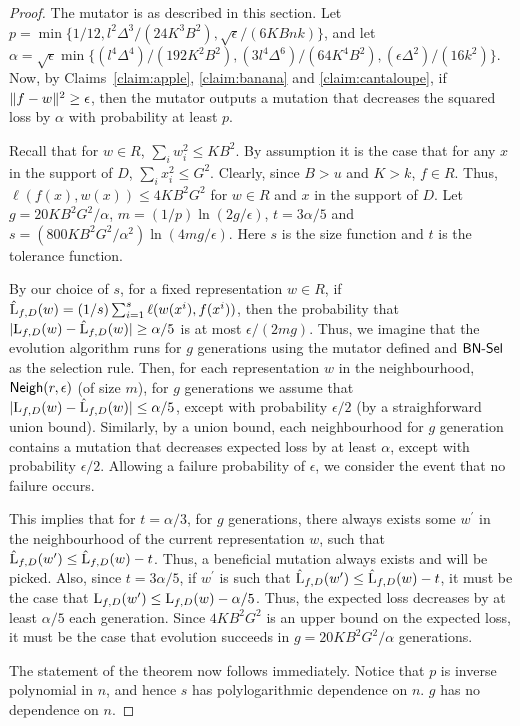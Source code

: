 \begin{proof}
The mutator is as described in this section. Let $p = \min\{1/12,
l^2\Delta^3/(24K^3B^2), \sqrt{\epsilon}/(6KBnk)\}$, and let $\alpha =
\sqrt{\epsilon} \min\{(l^4 \Delta^4)/(192 K^2B^2), (3 l^4 \Delta^6)/(64K^4B^2),
(\epsilon\Delta^2)/(16k^2)\}$. Now, by Claims~\ref{claim:apple},
\ref{claim:banana} and \ref{claim:cantaloupe}, if $\Vert f - w \Vert^2 \geq
\epsilon$, then the mutator outputs a mutation that decreases the squared loss
by $\alpha$ with probability at least $p$.

Recall that for $w \in R$, $\sum_{i} w_i^2 \leq KB^2$. By assumption it is the
case that for any $x$ in the support of $D$, $\sum_{i} x_i^2 \leq G^2$. Clearly,
since $B > u$ and $K > k$, $f \in R$. Thus, $\ell(f(x), w(x)) \leq 4KB^2G^2$ for
$w \in R$ and $x$ in the support of $D$. Let $g = 20 KB^2G^2/\alpha$, $m =
(1/p)\ln(2g/\epsilon)$, $t = 3\alpha/5$  and $s = (800 KB^2G^2/\alpha^2)
\ln(4mg/\epsilon)$. Here $s$ is the size function and $t$ is the tolerance
function.

By our choice of $s$, for a fixed representation $w \in R$, if $\hat{\mathrm{L}}_{f,
D}(w) = (1/s) \sum_{i = 1}^s \ell(w(x^i), f(x^i))$, then the probability that
$|\mathrm{L}_{f, D}(w) - \hat{\mathrm{L}}_{f, D}(w)| \geq \alpha/5$ is at most
$\epsilon/(2mg)$. Thus, we imagine that the evolution algorithm runs for $g$
generations using the mutator defined and $\mathsf{BN\mbox{-}Sel}$ as the selection rule. Then,
for each representation $w$ in the neighbourhood, $\mathsf{Neigh}(r, \epsilon)$ (of size
$m$), for $g$ generations we assume that $|\mathrm{L}_{f, D}(w) - \hat{\mathrm{L}}_{f,
D}(w)| \leq \alpha/5$, except with probability $\epsilon/2$ (by a straighforward
union bound). Similarly, by a union bound, each neighbourhood for $g$ generation
contains a mutation that decreases expected loss by at least $\alpha$, except
with probability $\epsilon/2$. Allowing a failure probability of $\epsilon$, we
consider the event that no failure occurs. 

This implies that for $t = \alpha/3$, for $g$ generations, there always exists
some $w^\prime$ in the neighbourhood of the current representation $w$, such
that $\hat{\mathrm{L}}_{f, D}(w^\prime) \leq \hat{\mathrm{L}}_{f, D}(w) - t$. Thus, a
beneficial mutation always exists and will be picked. Also, since $t = 3
\alpha/5$, if $w^\prime$ is such that $\hat{\mathrm{L}}_{f, D}(w^\prime) \leq
\hat{\mathrm{L}}_{f, D}(w) - t$, it must be the case that $\mathrm{L}_{f, D}(w^\prime) \leq
\mathrm{L}_{f, D}(w) - \alpha/5$. Thus, the expected loss decreases by at least
$\alpha/5$ each generation. Since $4KB^2G^2$ is an upper bound on the expected
loss, it must be the case that evolution succeeds in $g = 20 KB^2G^2/\alpha$
generations.

The statement of the theorem now follows immediately.
Notice that $p$ is inverse polynomial in $n$, and hence $s$ has
polylogarithmic dependence on $n$. $g$ has no dependence on $n$.
\end{proof}

